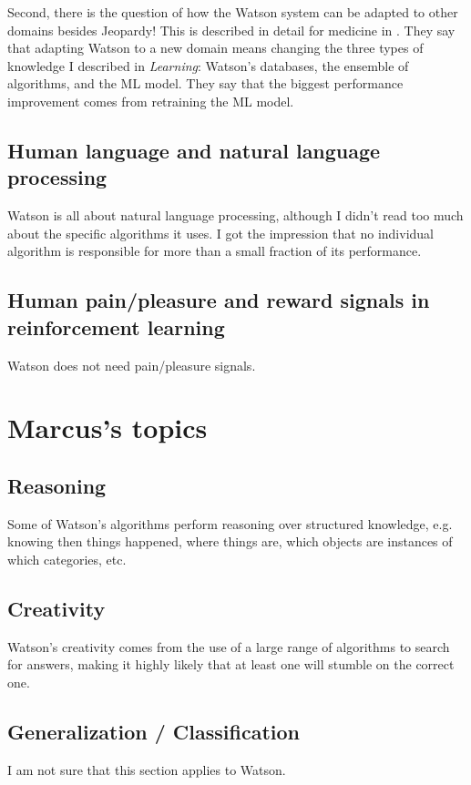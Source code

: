 \documentclass[10pt,a4paper]{article}
\begin{document}
Second, there is the question of how the Watson system can be adapted to other domains besides Jeopardy! This is described in detail for medicine in \cite{watsonmedicine}. They say that adapting Watson to a new domain means changing the three types of knowledge I described in \emph{Learning}: Watson's databases, the ensemble of algorithms, and the ML model. They say that the biggest performance improvement comes from retraining the ML model.

\subsection{Human language and natural language processing}
Watson is all about natural language processing, although I didn't read too much about the specific algorithms it uses. I got the impression that no individual algorithm is responsible for more than a small fraction of its performance.

\subsection{Human pain/pleasure and reward signals in reinforcement learning}
Watson does not need pain/pleasure signals.

\section{Marcus's topics}

\subsection{Reasoning}
Some of Watson's algorithms perform reasoning over structured knowledge, e.g. knowing then things happened, where things are, which objects are instances of which categories, etc.

\subsection{Creativity}
Watson's creativity comes from the use of a large range of algorithms to search for answers, making it highly likely that at least one will stumble on the correct one.

\subsection{Generalization / Classification}
I am not sure that this section applies to Watson.
\end{document}
